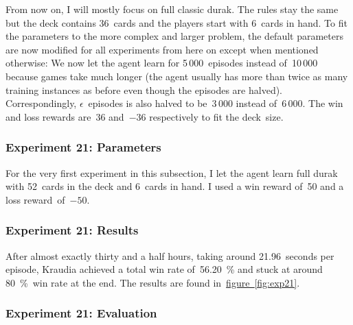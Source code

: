 \documentclass[a4paper,titlepage]{article}
\begin{document}
From now on, I will mostly focus on full classic durak. The rules stay the same but the deck contains 36~cards and the players start with 6~cards in hand. To fit the parameters to the more complex and larger problem, the default parameters are now modified for all experiments from here on except when mentioned otherwise: We now let the agent learn for 5\,000~episodes instead of~10\,000 because games take much longer (the agent usually has more than twice as many training instances as before even though the episodes are halved). Correspondingly, $\epsilon$~episodes is also halved to be~3\,000 instead of~6\,000. The win and loss rewards are~36 and~$-36$ respectively to fit the deck~size.

\subsubsection*{Experiment 21: Parameters}

For the very first experiment in this subsection, I let the agent learn full durak with 52~cards in the deck and 6~cards in hand. I used a win reward of~50 and a loss reward~of~$-50$.

\subsubsection*{Experiment 21: Results}

After almost exactly thirty and a half hours, taking around 21.96~seconds per episode, Kraudia achieved a total win rate of~56.20~\% and stuck at around 80~\%~win rate at the end. The results are found in~\hyperref[fig:exp21]{figure~\ref*{fig:exp21}}.

\subsubsection*{Experiment 21: Evaluation}
\end{document}
